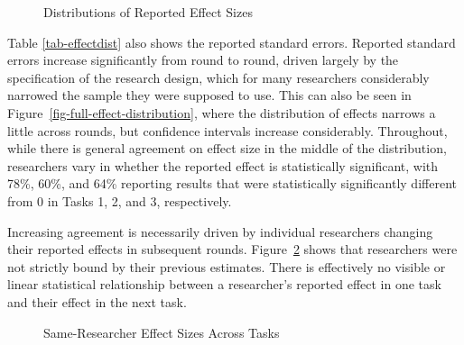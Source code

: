\documentclass[
  letterpaper,
  DIV=11,
  numbers=noendperiod]{scrartcl}
\begin{document}
\begin{figure}


\caption{\label{fig-effect-distributions}Distributions of Reported
Effect Sizes}

\end{figure}%

Table \ref{tab-effectdist} also shows the reported standard errors.
Reported standard errors increase significantly from round to round,
driven largely by the specification of the research design, which for
many researchers considerably narrowed the sample they were supposed to
use. This can also be seen in Figure~\ref{fig-full-effect-distribution},
where the distribution of effects narrows a little across rounds, but
confidence intervals increase considerably. Throughout, while there is
general agreement on effect size in the middle of the distribution,
researchers vary in whether the reported effect is statistically
significant, with 78\%, 60\%, and 64\% reporting results that were
statistically significantly different from 0 in Tasks 1, 2, and 3,
respectively.

Increasing agreement is necessarily driven by individual researchers
changing their reported effects in subsequent rounds.
Figure~\ref{fig-effects-compare-rounds} shows that researchers were not
strictly bound by their previous estimates. There is effectively no
visible or linear statistical relationship between a researcher's
reported effect in one task and their effect in the next task.

\begin{figure}


\caption{\label{fig-effects-compare-rounds}Same-Researcher Effect Sizes
Across Tasks}

\end{figure}%
\end{document}
